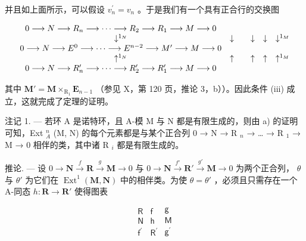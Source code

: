 并且如上面所示，可以假设 \(v_{n}^{\prime}=v_{n}\) 。于是我们有一个具有正合行的交换图

\[
\begin{array}{c c c c c c c c} 0 \longrightarrow N \longrightarrow R _ {n} \longrightarrow \dots \longrightarrow R _ {2} \longrightarrow R _ {1} \longrightarrow M \longrightarrow 0 \\ \downarrow^ {1 _ {N}} & \downarrow & & \downarrow & \downarrow & \downarrow^ {1 _ {M}} \\ 0 \longrightarrow N \longrightarrow E ^ {0} \longrightarrow \dots \longrightarrow E ^ {n - 2} \longrightarrow M ^ {\prime} \longrightarrow M \longrightarrow 0 \\ \uparrow^ {1 _ {N}} & \uparrow & & \uparrow & \uparrow & \uparrow^ {1 _ {M}} \\ 0 \longrightarrow N \longrightarrow R _ {n} ^ {\prime} \longrightarrow \dots \longrightarrow R _ {2} ^ {\prime} \longrightarrow R _ {1} ^ {\prime} \longrightarrow M \longrightarrow 0 \end{array}
\]

其中 \(\mathbf{M}' = \mathbf{M} \times_{\mathrm{R}_{1}} \mathbf{E}_{n-1}\) （参见 X，第 120 页，推论 3，b））。因此条件 (iii) 成立，这就完成了定理的证明。

注记 1. --- 若环 A 是诺特环，且 A-模 M 与 N 都是有限生成的，则由 a) 的证明可知，Ext \(_{A}^{n}\) (M, N) 的每个元素都是与某个正合列 0 → N → R \(_{n}\) → \ldots{} → R \(_{1}\) → M → 0 相伴的类，其中诸 R \(_{i}\) 都是有限生成的。

推论. --- 设 \(0 \to \mathbf{N} \xrightarrow{f} \mathbf{R} \xrightarrow{g} \mathbf{M} \to 0\) 与 \(0 \to \mathbf{N} \xrightarrow{f'} \mathbf{R}' \xrightarrow{g'} \mathbf{M} \to 0\) 为两个正合列， \(\theta\) 与 \(\theta'\) 为它们在 \(\operatorname{Ext}^1(\mathbf{M}, \mathbf{N})\) 中的相伴类。为使 \(\theta = \theta'\) ，必须且只需存在一个 A-同态 \(h: \mathbf{R} \to \mathbf{R}'\) 使得图表

\[
\begin{array}{c} \mathsf {R} \\ \mathsf {N} \\ \mathsf {f ^ {\prime}} \end{array} \begin{array}{c} \mathsf {f} \\ \mathsf {h} \\ \mathsf {R ^ {\prime}} \end{array} \begin{array}{c} \mathsf {g} \\ \mathsf {M} \\ \mathsf {g ^ {\prime}} \end{array}
\]

